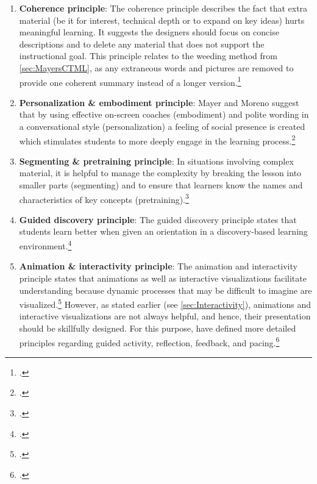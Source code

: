 \begin{enumerate}
    \item \textbf{Coherence principle}: The coherence principle describes the fact that extra material (be it for interest, technical depth or to expand on key ideas) hurts meaningful learning. It suggests the designers should focus on concise descriptions and to delete any material that does not support the instructional goal. This principle relates to the weeding method from \ref{sec:MayersCTML}, as any extraneous words and pictures are removed to provide one coherent summary instead of a longer version.\footcites[Cf.][chapter 8, paragraphs 1 et seq]{ClarkElearningscienceinstruction2016}[cf.][p.6]{MayerMultimediaLearning2009}[cf.][p.22]{MayerAnimationAidMultimedia2001}
    \item \textbf{Personalization \& embodiment principle}: Mayer and Moreno suggest that by using effective on-screen coaches (embodiment) and polite wording in a conversational style (personalization) a feeling of social presence is created which stimulates students to more deeply engage in the learning process.\footcites[Cf.][p.22]{MayerAnimationAidMultimedia2001} 
    \item \textbf{Segmenting \& pretraining principle}: In situations involving complex material, it is helpful to manage the complexity by breaking the lesson into smaller parts (segmenting) and to ensure that learners know the names and characteristics of key concepts (pretraining).\footcites[Cf.][chapters 9 and 10]{ClarkElearningscienceinstruction2016}
    \item \textbf{Guided discovery principle}: The guided discovery principle states that students learn better when given an orientation in a discovery-based learning environment.\footcites[Cf.][p.7]{MayerMultimediaLearning2009}
    \item \textbf{Animation \& interactivity principle}: The animation and interactivity principle states that animations as well as interactive visualizations facilitate understanding because dynamic processes that may be difficult to imagine are visualized.\footcites[Cf.][p.290]{Betrancourtanimationinteractivityprinciples2005}[cf.][p.81]{MunzerLearningmultimediapresentations2009}[cf.][p.19]{LeeScreenDesignGuidelines1999}[cf.][p.814]{MayerNineWaysReduce2003} However, as stated earlier (see \ref{sec:Interactivity}), animations and interactive visualizations are not always helpful, and hence, their presentation should be skillfully designed. For this purpose, \cite{MorenoInteractiveMultimodalLearning2007} have defined more detailed principles regarding guided activity, reflection, feedback, and pacing.\footcites[Cf.][p.292]{PatwardhanWhendoeshigher2015}[cf.][p.7]{MayerMultimediaLearning2009}[cf.][p.316]{MorenoInteractiveMultimodalLearning2007} %

\end{enumerate}
